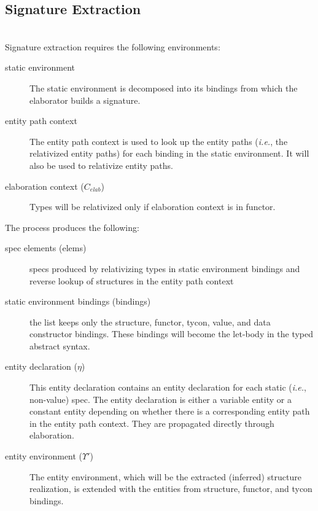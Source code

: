 \subsection{Signature Extraction}
\\
Signature extraction requires the following environments:
\begin{description}
\item[static environment] The static environment is decomposed into its bindings from which the elaborator builds a signature.
\item[entity path context] The entity path context is used to look up the entity paths (\emph{i.e.}, the relativized entity paths) for each binding in the static environment. It will also be used to relativize entity paths. 
\item[elaboration context ($C_{elab}$)] Types will be relativized only if elaboration context is in functor. 
\end{description}

The process produces the following:
\begin{description}
	\item[spec elements (elems)] specs produced by relativizing types in static environment bindings and reverse lookup of structures in the entity path context
	\item[static environment bindings (bindings)] the list keeps only the structure, functor, tycon, value, and data constructor bindings. These bindings will become the let-body in the typed abstract syntax.
	\item[entity declaration ($\eta$)] This entity declaration contains an entity declaration for each static (\emph{i.e.}, non-value) spec. The entity declaration is either a variable entity or a constant entity depending on whether there is a corresponding entity path in the entity path context. They are propagated directly through elaboration. 
	\item[entity environment ($\Upsilon'$)] The entity environment, which will be the extracted (inferred) structure realization, is extended with the entities from structure, functor, and tycon bindings. 
\end{description}

